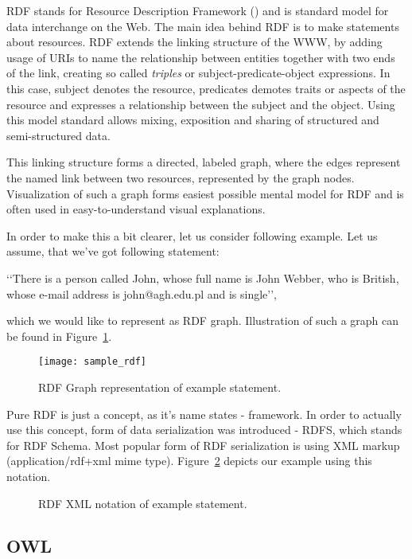 RDF stands for Resource Description Framework (\cite{rdfPrimer:2004}) and is standard model for data interchange on the Web. The main idea behind RDF is to make statements about resources. RDF extends the linking structure of the WWW, by adding usage of URIs to name the relationship between entities together with two ends of the link, creating so called \emph{triples} or subject-predicate-object expressions. In this case, subject denotes the resource, predicates demotes traits or aspects of the resource and expresses a relationship between the subject and the object. Using this model standard allows mixing, exposition and sharing of structured and semi-structured data.

This linking structure forms a directed, labeled graph, where the edges represent the named link between two resources, represented by the graph nodes. Visualization of such a graph forms easiest possible mental model for RDF and is often used in easy-to-understand visual explanations.

In order to make this a bit clearer, let us consider following example. Let us assume, that we\rq{}ve got following statement:

\lq\lq{}There is a person called John, whose full name is John Webber, who is British, whose e-mail address is john@agh.edu.pl and is single\rq\rq{}, 
  
which we would like to represent as RDF graph. Illustration of such a graph can be found in Figure~\ref{fig:sample_rdf}.

\begin{figure}[ht]
  \centering
  \texttt{[image: sample\_rdf]}
  \caption{RDF Graph representation of example statement.}
  \label{fig:sample_rdf}
\end{figure}

Pure RDF is just a concept, as it\rq{}s name states - framework. In order to actually use this concept, form of data serialization was introduced - RDFS, which stands for RDF Schema\cite{rdfRef:2004}. Most popular form of RDF serialization is using XML  markup (application/rdf+xml mime type). Figure~\ref{fig:sample_rdf_xml} depicts our example using this notation.

\begin{figure}[ht]
  \centering
  
  \caption{RDF XML notation of example statement.}
  \label{fig:sample_rdf_xml}
\end{figure}


\subsection{OWL}

